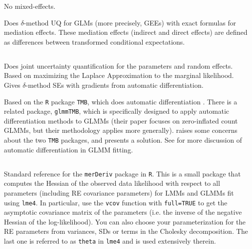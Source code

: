 \documentclass{article}
\begin{document}
No mixed-effects.

Does $\delta$-method UQ for GLMs (more precisely, GEEs) with exact formulas for mediation effects. These mediation effects (indirect and direct effects) are defined as differences between transformed conditional expectations. 


\subsection{\citet{Zhe21}}

Does joint uncertainty quantification for the parameters and random effects. Based on maximizing the Laplace Approximation to the marginal likelihood. Gives $\delta$-method SEs with gradients from automatic differentiation.

Based on the \texttt{R} package \texttt{TMB}, which does automatic differentiation \citep{Kri16}. There is a related package, \texttt{glmmTMB}, which is specifically designed to apply automatic differentiation methods to GLMMs \citep{Bro17} (their paper focuses on zero-inflated count GLMMs, but their methodology applies more generally). \citet{Zhe21} raises some concerns about the two \texttt{TMB} packages, and presents a solution. See \citet{Ska06} for more discussion of automatic differentiation in GLMM fitting.

\subsection{\citet{Wan18}}

Standard reference for the \texttt{merDeriv} package in \texttt{R}. This is a small package that computes the Hessian of the observed data likelihood with respect to all parameters (including RE covariance parameters) for LMMs and GLMMs fit using \texttt{lme4}. In particular, use the \texttt{vcov} function with \texttt{full=TRUE} to get the asymptotic covariance matrix of the parameters (i.e. the inverse of the negative Hessian of the log-likelihood). You can also choose your parameterization for the RE parameters from variances, SDs or terms in the Cholesky decomposition. The last one is referred to as \texttt{theta} in \texttt{lme4} and is used extensively therein.




\end{document}
